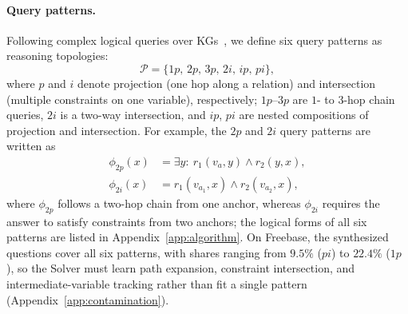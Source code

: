 \paragraph{Query patterns.}
Following complex logical queries over KGs~\citep{ren2020betae}, we define six query patterns as reasoning topologies:
\begin{equation}
\mathcal{P}=\{1p,\,2p,\,3p,\,2i,\,ip,\,pi\},
\end{equation}
where $p$ and $i$ denote projection (one hop along a relation) and intersection (multiple constraints on one variable), respectively; $1p$--$3p$ are $1$- to $3$-hop chain queries, $2i$ is a two-way intersection, and $ip$, $pi$ are nested compositions of projection and intersection. For example, the $2p$ and $2i$ query patterns are written as
\begin{equation}
\label{eq:2p-2i}
\begin{aligned}
\phi_{2p}(x)&=\exists y:\ r_1(v_a,y)\wedge r_2(y,x),\\
\phi_{2i}(x)&=r_1(v_{a_1},x)\wedge r_2(v_{a_2},x),
\end{aligned}
\end{equation}
where $\phi_{2p}$ follows a two-hop chain from one anchor, whereas $\phi_{2i}$ requires the answer to satisfy constraints from two anchors; the logical forms of all six patterns are listed in Appendix~\ref{app:algorithm}. On Freebase, the synthesized questions cover all six patterns, with shares ranging from $9.5\%$ ($pi$) to $22.4\%$ ($1p$), so the Solver must learn path expansion, constraint intersection, and intermediate-variable tracking rather than fit a single pattern (Appendix~\ref{app:contamination}).

